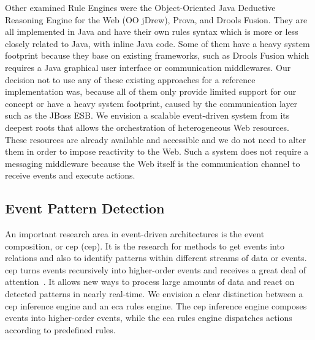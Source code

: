 Other examined Rule Engines were the \textrm{Object-Oriented Java Deductive Reasoning Engine for the Web} (\textrm{OO jDrew}), \textrm{Prova}, and \textrm{Drools Fusion}.
They are all implemented in \textrm{Java} and have their own rules syntax which is more or less closely related to \textrm{Java}, with inline \textrm{Java} code.
Some of them have a heavy system footprint because they base on existing frameworks, such as \textrm{Drools Fusion} which requires a Java graphical user interface or communication middlewares.
Our decision not to use any of these existing approaches for a reference implementation was, because all of them only provide limited support for our concept or have a heavy system footprint, caused by the communication layer such as the {JBoss ESB}.
We envision a scalable event-driven system from its deepest roots that allows the orchestration of heterogeneous Web resources.
These resources are already available and accessible and we do not need to alter them in order to impose reactivity to the Web.
Such a system does not require a messaging middleware because the Web itself is the communication channel to receive events and execute actions.


\subsection{Event Pattern Detection}
An important research area in event-driven architectures is the event composition, or \textrm{\acrlong{cep} (\acrshort{cep})}.
It is the research for methods to get events into relations and also to identify patterns within different streams of data or events.
\textrm{\acrshort{cep}} turns events recursively into higher-order events and receives a great deal of attention~\cite{akdere2008plan}\cite{anicic2010arlfcepar}\cite{Gehani92compositeevent}\cite{2006Muehl}\cite{2004_1265833}\cite{Rafatirad:2009:ECO:1631024.1631038}.
It allows new ways to process large amounts of data and react on detected patterns in nearly real-time.
We envision a clear distinction between a \textrm{\acrshort{cep}} inference engine and an \textrm{\acrshort{eca}} rules engine.
The \textrm{\acrshort{cep}} inference engine composes events into higher-order events, while the \textrm{\acrshort{eca}} rules engine dispatches actions according to predefined rules.



